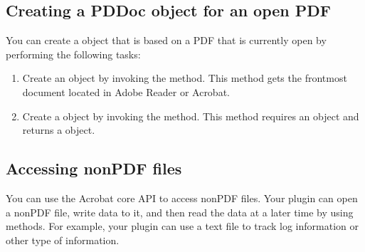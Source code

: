 \documentclass[letterpaper,12pt,english,openany,oneside]{sphinxmanual}
\begin{document}
\subsection{Creating a PDDoc object for an open PDF}
\label{\detokenize{Plugins_Documents:creating-a-pddoc-object-for-an-open-pdf}}
You can create a  object that is based on a PDF that is currently open by performing the following tasks:
\begin{enumerate}
%
\item {} 
Create an  object by invoking the  method. This method gets the frontmost document located in Adobe Reader or Acrobat.

\item {} 
Create a  object by invoking the  method. This method requires an  object and returns a  object.

\end{enumerate}

\begin{sphinxVerbatim}[commandchars=\\\{\}]
   
   
\end{sphinxVerbatim}


\subsection{Accessing non\sphinxhyphen{}PDF files}
\label{\detokenize{Plugins_Documents:accessing-non-pdf-files}}
You can use the Acrobat core API to access non\sphinxhyphen{}PDF files. Your plugin can open a non\sphinxhyphen{}PDF file, write data to it, and then read the data at a later time by using  methods. For example, your plugin can use a text file to track log information or other type of information.
\end{document}

